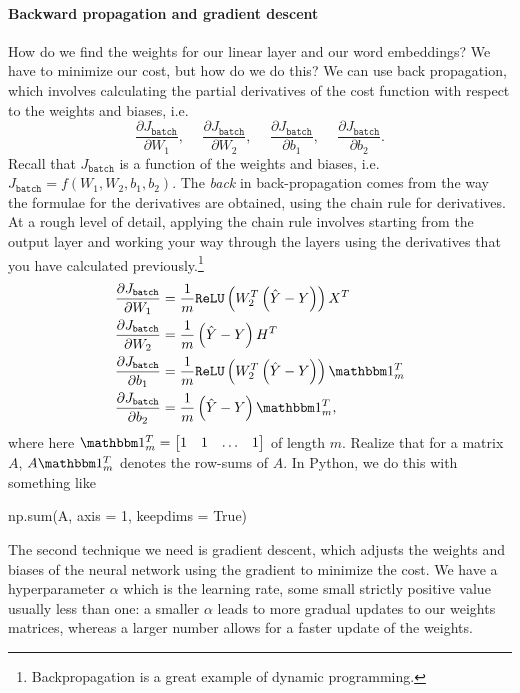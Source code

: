 \documentclass[12pt]{article}
\begin{document}
\paragraph{Backward propagation and gradient descent} How do we find the weights for our linear layer and our word embeddings? We have to minimize our cost, but how do we do this? We can use back propagation, which involves calculating the partial derivatives of the cost function with respect to the weights and biases, i.e.
\[
  \frac{\partial J_{\texttt{batch}}}{\partial W_1}, \hspace{15pt}
  \frac{\partial J_{\texttt{batch}}}{\partial W_2}, \hspace{15pt}   
  \frac{\partial J_{\texttt{batch}}}{\partial b_1}, \hspace{15pt} 
  \frac{\partial     J_{\texttt{batch}}}{\partial b_2}.
\]
Recall that $J_{\texttt{batch}}$ is a function of the weights and biases, i.e. $J_{\texttt{batch}} = f(W_1, W_2, b_1, b_2)$. The \emph{back} in back-propagation comes from the way the formulae for the derivatives are obtained, using the chain rule for derivatives. At a rough level of detail, applying the chain rule involves starting from the output layer and working your way through the layers using the derivatives that you have calculated previously.\footnote{Backpropagation is a great example of dynamic programming.}
\begin{align*}
  \frac{\partial J_{\texttt{batch}}}{\partial W_1} &= \frac{1}{m} \texttt{ReLU}\left(W_2^T\left(\hat Y - Y\right) \right)X^T \\
  \frac{\partial J_{\texttt{batch}}}{\partial W_2} &= \frac{1}{m} \left(\hat Y -Y \right) H^T \\
  \frac{\partial J_{\texttt{batch}}}{\partial b_1} &= \frac{1}{m} \texttt{ReLU}\left(W_2^T\left(\hat Y - Y \right) \right) \mathbbm 1_m^T \\
  \frac{\partial     J_{\texttt{batch}}}{\partial b_2} &= \frac{1}{m} \left(\hat Y - Y \right) \mathbbm 1_m^T,
\end{align*}
where here $\mathbbm 1_m^T = \begin{bmatrix}1 & 1 & \ldots & 1 \end{bmatrix}$ of length $m$. Realize that for a matrix $A$, $A \mathbbm 1_m^T$ denotes the row-sums of $A$. In Python, we do this with something like
\begin{python}
np.sum(A, axis = 1, keepdims = True)
\end{python}

The second technique we need is gradient descent, which adjusts the weights and biases of the neural network using the gradient to minimize the cost. We have a hyperparameter $\alpha$ which is the learning rate, some small strictly positive value usually less than one: a smaller $\alpha$ leads to more gradual updates to our weights matrices, whereas a larger number allows for a faster update of the weights.
\end{document}
